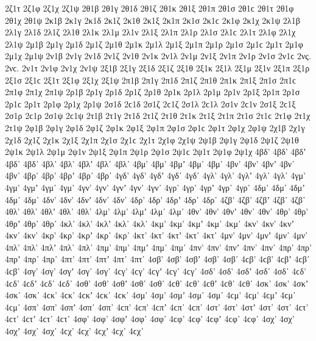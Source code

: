 {2ζ1τ 
2ζ1φ 
2ζ1χ 
2ζ1ψ 
%
2θ1β 
2θ1γ 
2θ1δ 
2θ1ζ 
2θ1κ 
2θ1ξ 
2θ1π 
2θ1σ 2θ1ϲ 
2θ1τ 
2θ1φ 
2θ1χ 
2θ1ψ 
%
2κ1β 
2κ1γ 
2κ1δ 
2κ1ζ 
2κ1θ 
2κ1ξ 
2κ1π 
2κ1σ 2κ1ϲ 
2κ1φ 
2κ1χ 
2κ1ψ 
%
2λ1β 
2λ1γ 
2λ1δ 
2λ1ζ 
2λ1θ 
2λ1κ 
2λ1μ 
2λ1ν 
2λ1ξ 
2λ1π 
2λ1ρ 
2λ1σ 2λ1ϲ 
2λ1τ 
2λ1φ 
2λ1χ 
2λ1ψ 
%
2μ1β 
2μ1γ 
2μ1δ 
2μ1ζ 
2μ1θ 
2μ1κ 
2μ1λ 
2μ1ξ 
2μ1π 
2μ1ρ 
2μ1σ 2μ1ϲ 
2μ1τ 
2μ1φ 
2μ1χ 
2μ1ψ 
%
2ν1β 
2ν1γ 
2ν1δ 
2ν1ζ 
2ν1θ 
2ν1κ 
2ν1λ 
2ν1μ 
2ν1ξ 
2ν1π 
2ν1ρ 
2ν1σ 2ν1ϲ 
2νς. 2νϲ. 
2ν1τ 
2ν1φ 
2ν1χ 
2ν1ψ 
%
2ξ1β 
2ξ1γ 
2ξ1δ 
2ξ1ζ 
2ξ1θ 
2ξ1κ 
2ξ1λ 
2ξ1μ 
2ξ1ν 
2ξ1π 
2ξ1ρ 
2ξ1σ 2ξ1ϲ 
2ξ1τ 
2ξ1φ 
2ξ1χ 
2ξ1ψ 
%
2π1β 
2π1γ 
2π1δ 
2π1ζ 
2π1θ 
2π1κ 
2π1ξ 
2π1σ 2π1ϲ 
2π1φ 
2π1χ 
2π1ψ 
%
2ρ1β 
2ρ1γ 
2ρ1δ 
2ρ1ζ 
2ρ1θ 
2ρ1κ 
2ρ1λ 
2ρ1μ 
2ρ1ν 
2ρ1ξ 
2ρ1π 
2ρ1σ 2ρ1ϲ 
2ρ1τ 
2ρ1φ 
2ρ1χ 
2ρ1ψ 
%
2σ1δ 2ϲ1δ   %
2σ1ζ 2ϲ1ζ 
2σ1λ 2ϲ1λ 
2σ1ν 2ϲ1ν 
2σ1ξ 2ϲ1ξ 
2σ1ρ 2ϲ1ρ 
2σ1ψ 2ϲ1ψ 
%
2τ1β 
2τ1γ 
2τ1δ 
2τ1ζ 
2τ1θ 
2τ1κ 
2τ1ξ 
2τ1π 
2τ1σ 2τ1ϲ 
2τ1φ 
2τ1χ 
2τ1ψ 
%
2φ1β 
2φ1γ 
2φ1δ 
2φ1ζ 
2φ1κ 
2φ1ξ 
2φ1π 
2φ1σ 2φ1ϲ 
2φ1τ 
2φ1χ 
2φ1ψ 
%
2χ1β 
2χ1γ 
2χ1δ 
2χ1ζ 
2χ1κ 
2χ1ξ 
2χ1π 
2χ1σ 2χ1ϲ 
2χ1τ 
2χ1φ 
2χ1ψ 
%
2ψ1β 
2ψ1γ 
2ψ1δ 
2ψ1ζ 
2ψ1θ 
2ψ1κ 
2ψ1λ 
2ψ1μ 
2ψ1ν 
2ψ1ξ 
2ψ1π 
2ψ1ρ 
2ψ1σ 2ψ1ϲ 
2ψ1τ 
2ψ1φ 
2ψ1χ 
4βδ' 4βδ’ 4βδʼ 4βδ᾽ 4βδ᾿ 
4βλ' 4βλ’ 4βλʼ 4βλ᾽ 4βλ᾿ 
4βμ' 4βμ’ 4βμʼ 4βμ᾽ 4βμ᾿ 
4βν' 4βν’ 4βνʼ 4βν᾽ 4βν᾿ 
4βρ' 4βρ’ 4βρʼ 4βρ᾽ 4βρ᾿ 
%
4γδ' 4γδ’ 4γδʼ 4γδ᾽ 4γδ᾿ 
4γλ' 4γλ’ 4γλʼ 4γλ᾽ 4γλ᾿ 
4γμ' 4γμ’ 4γμʼ 4γμ᾽ 4γμ᾿ 
4γν' 4γν’ 4γνʼ 4γν᾽ 4γν᾿ 
4γρ' 4γρ’ 4γρʼ 4γρ᾽ 4γρ᾿ 
%
4δμ' 4δμ’ 4δμʼ 4δμ᾽ 4δμ᾿ 
4δν' 4δν’ 4δνʼ 4δν᾽ 4δν᾿ 
4δρ' 4δρ’ 4δρʼ 4δρ᾽ 4δρ᾿ 
%
4ζβ' 4ζβ’ 4ζβʼ 4ζβ᾽ 4ζβ᾿ 
%
4θλ' 4θλ’ 4θλʼ 4θλ᾽ 4θλ᾿ 
4λμ' 4λμ’ 4λμʼ 4λμ᾽ 4λμ᾿ 
4θν' 4θν’ 4θνʼ 4θν᾽ 4θν᾿ 
4θρ' 4θρ’ 4θρʼ 4θρ᾽ 4θρ᾿ 
%
4κλ' 4κλ’ 4κλʼ 4κλ᾽ 4κλ᾿ 
4κμ' 4κμ’ 4κμʼ 4κμ᾽ 4κμ᾿ 
4κν' 4κν’ 4κνʼ 4κν᾽ 4κν᾿ 
4κρ' 4κρ’ 4κρʼ 4κρ᾽ 4κρ᾿ 
4κτ' 4κτ’ 4κτʼ 4κτ᾽ 4κτ᾿ 
%
4μν' 4μν’ 4μνʼ 4μν᾽ 4μν᾿ 
%
4πλ' 4πλ’ 4πλʼ 4πλ᾽ 4πλ᾿ 
4πμ' 4πμ’ 4πμʼ 4πμ᾽ 4πμ᾿ 
4πν' 4πν’ 4πνʼ 4πν᾽ 4πν᾿ 
4πρ' 4πρ’ 4πρʼ 4πρ᾽ 4πρ᾿ 
4πτ' 4πτ’ 4πτʼ 4πτ᾽ 4πτ᾿ 
%
4σβ' 4σβ’ 4σβʼ 4σβ᾽ 4σβ᾿ 4ϲβ' 4ϲβ’ 4ϲβʼ 4ϲβ᾽ 4ϲβ᾿ 
4σγ' 4σγ’ 4σγʼ 4σγ᾽ 4σγ᾿ 4ϲγ' 4ϲγ’ 4ϲγʼ 4ϲγ᾽ 4ϲγ᾿ 
4σδ' 4σδ’ 4σδʼ 4σδ᾽ 4σδ᾿ 4ϲδ' 4ϲδ’ 4ϲδʼ 4ϲδ᾽ 4ϲδ᾿ 
4σθ' 4σθ’ 4σθʼ 4σθ᾽ 4σθ᾿ 4ϲθ' 4ϲθ’ 4ϲθʼ 4ϲθ᾽ 4ϲθ᾿ 
4σκ' 4σκ’ 4σκʼ 4σκ᾽ 4σκ᾿ 4ϲκ' 4ϲκ’ 4ϲκʼ 4ϲκ᾽ 4ϲκ᾿ 
4σμ' 4σμ’ 4σμʼ 4σμ᾽ 4σμ᾿ 4ϲμ' 4ϲμ’ 4ϲμʼ 4ϲμ᾽ 4ϲμ᾿ 
4σπ' 4σπ’ 4σπʼ 4σπ᾽ 4σπ᾿ 4ϲπ' 4ϲπ’ 4ϲπʼ 4ϲπ᾽ 4ϲπ᾿ 
4στ' 4στ’ 4στʼ 4στ᾽ 4στ᾿ 4ϲτ' 4ϲτ’ 4ϲτʼ 4ϲτ᾽ 4ϲτ᾿ 
4σφ' 4σφ’ 4σφʼ 4σφ᾽ 4σφ᾿ 4ϲφ' 4ϲφ’ 4ϲφʼ 4ϲφ᾽ 4ϲφ᾿ 
4σχ' 4σχ’ 4σχʼ 4σχ᾽ 4σχ᾿ 4ϲχ' 4ϲχ’ 4ϲχʼ 4ϲχ᾽ 4ϲχ᾿ 
}
